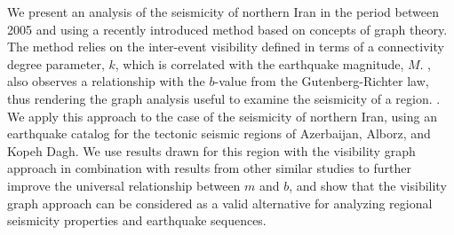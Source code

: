 %
We present an analysis of the seismicity of northern Iran in the period between 2005 and  using a recently introduced method based on concepts of graph theory. The method relies on the inter-event visibility defined in terms of a connectivity degree parameter, $k$, which is correlated with the earthquake magnitude, $M$. , also observes a relationship with the $b$-value from the Gutenberg-Richter law, thus rendering the graph analysis useful to examine the seismicity of a region. . We apply this approach to the case of the seismicity of northern Iran, using an earthquake catalog for the tectonic seismic regions of Azerbaijan, Alborz, and Kopeh Dagh. We use results drawn for this region with the visibility graph approach in combination with results from other similar studies to further improve the universal relationship between $m$ and $b$, and show that the visibility graph approach can be considered as a valid alternative for analyzing regional seismicity properties and earthquake sequences.
